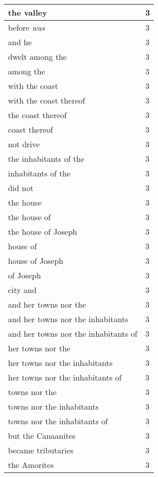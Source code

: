 \begin{center}
\begin{longtable}{|p{3.0in}|p{0.5in}|}
the valley & 3\\ \hline 
before \emph{was} & 3\\ \hline 
and he & 3\\ \hline 
dwelt among the & 3\\ \hline 
among the & 3\\ \hline 
with the coast & 3\\ \hline 
with the coast thereof & 3\\ \hline 
the coast thereof & 3\\ \hline 
coast thereof & 3\\ \hline 
not drive & 3\\ \hline 
the inhabitants of the & 3\\ \hline 
inhabitants of the & 3\\ \hline 
did not & 3\\ \hline 
the house & 3\\ \hline 
the house of & 3\\ \hline 
the house of Joseph & 3\\ \hline 
house of & 3\\ \hline 
house of Joseph & 3\\ \hline 
of Joseph & 3\\ \hline 
city and & 3\\ \hline 
and her towns nor the & 3\\ \hline 
and her towns nor the inhabitants & 3\\ \hline 
and her towns nor the inhabitants of & 3\\ \hline 
her towns nor the & 3\\ \hline 
her towns nor the inhabitants & 3\\ \hline 
her towns nor the inhabitants of & 3\\ \hline 
towns nor the & 3\\ \hline 
towns nor the inhabitants & 3\\ \hline 
towns nor the inhabitants of & 3\\ \hline 
but the Canaanites & 3\\ \hline 
became tributaries & 3\\ \hline 
the Amorites & 3\\ \hline 
\end{longtable}
\end{center}





